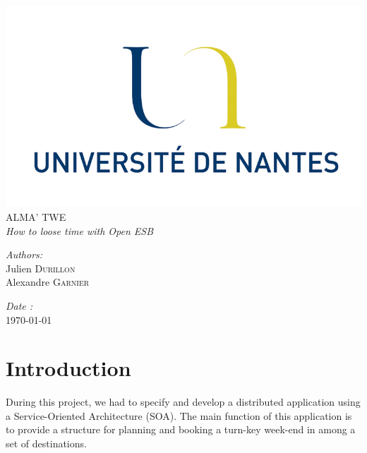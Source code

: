 \documentclass[a4paper]{article}
\begin{document}
	\begin{titlepage}
		\begin{center}
		\includegraphics{logo_fac.png}\\[3.0cm]
		{\Huge ALMA' TWE}\\[0.5cm]
		{\huge\itshape How to loose time with Open ESB}\\[3.0cm]
		\end{center}
		
		\begin{minipage}{0.4\textwidth}
		\begin{flushleft}
			\emph{Authors:}\\[0.1cm]
			Julien \textsc{Durillon}\\
			Alexandre \textsc{Garnier}
		\end{flushleft}
		\end{minipage}
		\begin{minipage}{0.4\textwidth}
		\begin{flushright}
			\emph{Date :}\\[0.1cm]
			\today
		\end{flushright}
		\end{minipage}
		
	\end{titlepage}

	\tableofcontents\clearpage

	\section*{Introduction}
	
		During this project, we had to specify and develop a distributed application using a Service-Oriented Architecture (SOA).
		The main function of this application is to provide a structure for planning and booking a turn-key week-end in among a set of destinations.
		
\end{document}
